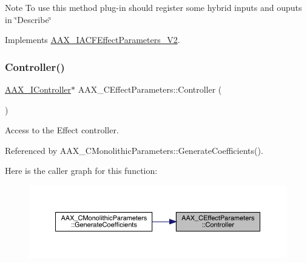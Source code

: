 \begin{DoxyNote}{Note}
To use this method plug-\/in should register some hybrid inputs and ouputs in \char`\"{}\+Describe\char`\"{} 
\end{DoxyNote}


Implements \mbox{\hyperlink{a00805_gae6139041de22f51f3146d26a01c54c1b}{A\+A\+X\+\_\+\+I\+A\+C\+F\+Effect\+Parameters\+\_\+\+V2}}.

\mbox{\label{a01481_a2aad1f84d38b40fee029629c53273a56}} 
\subsubsection{\texorpdfstring{Controller()}{Controller()}\hspace{0.1cm}{\footnotesize\ttfamily [1/2]}}
{\footnotesize\ttfamily \mbox{\hyperlink{a01789}{A\+A\+X\+\_\+\+I\+Controller}}$\ast$ A\+A\+X\+\_\+\+C\+Effect\+Parameters\+::\+Controller (\begin{DoxyParamCaption}{ }\end{DoxyParamCaption})}



Access to the Effect controller. 



Referenced by A\+A\+X\+\_\+\+C\+Monolithic\+Parameters\+::\+Generate\+Coefficients().

Here is the caller graph for this function\+:
\nopagebreak
\begin{figure}[H]
\begin{center}
\leavevmode
\includegraphics[width=350pt]{a01481_a2aad1f84d38b40fee029629c53273a56_icgraph}
\end{center}
\end{figure}
\mbox{\label{a01481_a36cda1bd12573e6ddd21fdd90b460ece}} 

